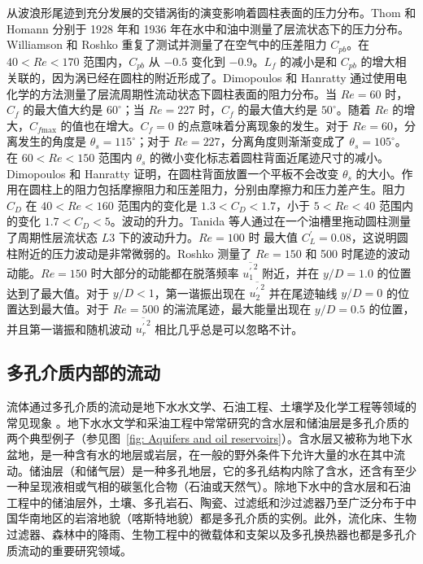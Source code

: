 从波浪形尾迹到充分发展的交错涡街的演变影响着圆柱表面的压力分布。Thom 和 Homann 分别于 1928 年和 1936 年在水中和油中测量了层流状态下的压力分布。Williamson 和 Roshko \cite{Williamson1990} 重复了测试并测量了在空气中的压差阻力 $C_{pb}$。在 $40<Re<170$ 范围内，$C_{pb}$ 从 $-0.5$ 变化到 $-0.9$。$L_f$ 的减小是和 $C_{pb}$ 的增大相关联的，因为涡已经在圆柱的附近形成了。Dimopoulos 和 Hanratty \cite{Dimopoulos1968} 通过使用电化学的方法测量了层流周期性流动状态下圆柱表面的阻力分布。当 $Re=60$ 时，$C_f$ 的最大值大约是 $60^\circ$；当 $Re=227$ 时，$C_f$ 的最大值大约是 $50^\circ$。随着 $Re$ 的增大，$C_{f\text{max}}$ 的值也在增大。$C_f=0$ 的点意味着分离现象的发生。对于 $Re=60$，分离发生的角度是 $\theta_s=115^\circ$；对于 $Re=227$，分离角度则渐渐变成了 $\theta_s=105^\circ$。在 $60<Re<150$ 范围内 $\theta_s$ 的微小变化标志着圆柱背面近尾迹尺寸的减小。Dimopoulos 和 Hanratty \cite{Dimopoulos1968} 证明，在圆柱背面放置一个平板不会改变 $\theta_s$ 的大小。作用在圆柱上的阻力包括摩擦阻力和压差阻力，分别由摩擦力和压力差产生。阻力 $C_D$ 在 $40<Re<160$ 范围内的变化是 $1.3<C_D<1.7$，小于 $5<Re<40$ 范围内的变化 $1.7<C_D<5$。波动的升力。Tanida \cite{Tanida1973} 等人通过在一个油槽里拖动圆柱测量了周期性层流状态 $L3$ 下的波动升力。$Re=100$ 时 最大值 $C_L^\prime=0.08$，这说明圆柱附近的压力波动是非常微弱的。Roshko \cite{Roshko1954} 测量了 $Re=150$ 和 500 时尾迹的波动动能。$Re=150$ 时大部分的动能都在脱落频率 $\overline{{u_1^\prime}^2}$ 附近，并在 $y/D=1.0$ 的位置达到了最大值。对于 $y/D < 1$，第一谐振出现在 $\overline{{u_2^\prime}^2}$ 并在尾迹轴线 $y/D=0$ 的位置达到最大值。对于 $Re=500$ 的湍流尾迹，最大能量出现在 $y/D=0.5$ 的位置，并且第一谐振和随机波动 $\overline{{u_r^\prime}^2}$ 相比几乎总是可以忽略不计。

\subsection{多孔介质内部的流动}

流体通过多孔介质的流动是地下水水文学、石油工程、土壤学及化学工程等领域的常见现象 \cite{Bear2013}。地下水水文学和采油工程中常常研究的含水层和储油层是多孔介质的两个典型例子（参见图~\ref{fig: Aquifers and oil reservoirs}）。含水层又被称为地下水盆地，是一种含有水的地层或岩层，在一般的野外条件下允许大量的水在其中流动。储油层（和储气层）是一种多孔地层，它的多孔结构内除了含水，还含有至少一种呈现液相或气相的碳氢化合物（石油或天然气）。除地下水中的含水层和石油工程中的储油层外，土壤、多孔岩石、陶瓷、过滤纸和沙过滤器乃至广泛分布于中国华南地区的岩溶地貌（喀斯特地貌）都是多孔介质的实例。此外，流化床、生物过滤器、森林中的降雨、生物工程中的微载体和支架以及多孔换热器也都是多孔介质流动的重要研究领域。

